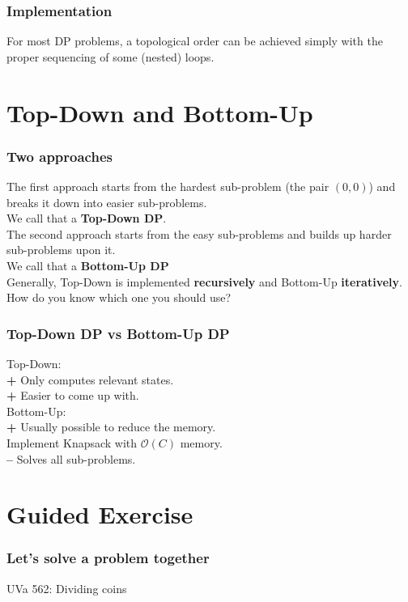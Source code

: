 \documentclass[12pt]{beamer}
\newcommand{\bigoh}[1]{\mathcal{O}\left(#1\right)}
\newcommand{\blank}{\vspace{.5cm}}
\begin{document}
\begin{frame}
    \frametitle{Implementation}
    
    \blank
    For most DP problems, a topological order can be achieved simply with the proper sequencing of some (nested) loops.
\end{frame}

\section{Top-Down and Bottom-Up}

\begin{frame}
    \frametitle{Two approaches}
    The first approach starts from the hardest sub-problem (the pair $(0, 0)$) and breaks it down into easier sub-problems. \\\blank
    We call that a \textbf{Top-Down DP}. \\\blank
    The second approach starts from the easy sub-problems and builds up harder sub-problems upon it. \\\blank
    We call that a \textbf{Bottom-Up DP} \\\blank
    Generally, Top-Down is implemented \textbf{recursively} and Bottom-Up \textbf{iteratively}. \\\blank
    How do you know which one you should use?
\end{frame}

\begin{frame}
    \frametitle{Top-Down DP vs Bottom-Up DP}
    Top-Down: \\\blank
    \textbf{+} Only computes relevant states. \\\blank
    \textbf{+} Easier to come up with. \\\blank
    Bottom-Up: \\\blank
    \textbf{+} Usually possible to reduce the memory. \\\blank
    \PencilRightDown Implement Knapsack with $\bigoh{C}$ memory. \\\blank
    \textbf{--} Solves all sub-problems.
\end{frame}

\section{Guided Exercise}

\begin{frame}
    \frametitle{Let's solve a problem together}
    \centering
    \Huge{UVa 562: Dividing coins}
\end{frame}
\end{document}

